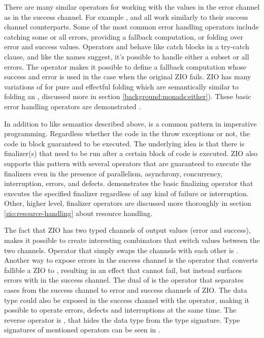 There are many similar operators for working with the values in the error channel as in the success channel. For example ,  and  all work similarly to their success channel counterparts. Some of the most common error handling operators include catching some or all errors, providing a fallback computation, or folding over error and success values. Operators  and  behave like catch blocks in a try-catch clause, and like the names suggest, it's possible to handle either a subset or all errors. The  operator makes it possible to define a fallback computation whose success and error is used in the case when the original ZIO fails. ZIO has many variations of  for pure and effectful folding which are semantically similar to folding an , discussed more in section \ref{background:monads:either}). These basic error handling operators are demonstrated .



In addition to  like semantics described above,  is a common pattern in imperative programming. Regardless whether the code in the  throw exceptions or not, the code in  block guaranteed to be executed. The underlying idea is that there is finalizer(s) that need to be run after a certain block of code is executed. ZIO also supports this pattern with several operators that are guaranteed to execute the finalizers even in the presence of parallelism, asynchrony, concurrency, interruption, errors, and defects.  demonstrates the basic finalizing operator  that executes the specified finalizer regardless of any kind of failure or interruption. Other, higher level, finalizer operators are discussed more thoroughly in section \ref{zio:resource-handling} about resource handling.



The fact that ZIO has two typed channels of output values (error and success), makes it possible to create interesting combinators that switch values between the two channels. Operator that simply swaps the channels with each other is . Another way to expose errors in the success channel is the  operator that converts fallible a ZIO to , resulting in an effect that cannot fail, but instead surfaces errors with  in the success channel. The dual of  is the operator  that separates  cases from the success channel to error and success channels of ZIO. The  data type could also be exposed in the success channel with the  operator, making it possible to operate errors, defects and interruptions at the same time. The reverse operator is , that hides the  data type from the type signature. Type signatures of mentioned operators can be seen in .

